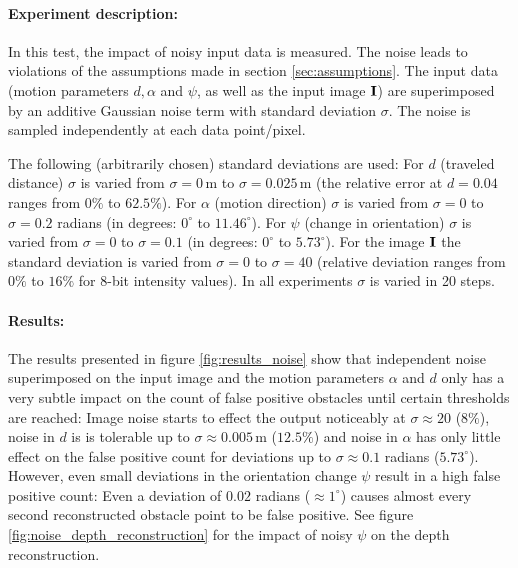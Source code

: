 \paragraph{Experiment description:} In this test, the impact of noisy input data is measured. The noise leads to violations of the assumptions made in section \ref{sec:assumptions}. The input data (motion parameters $d, \alpha$ and $\psi$, as well as the input image $\mathbf{I}$) are superimposed by an additive Gaussian noise term with standard deviation $\sigma$. The noise is sampled independently at each data point/pixel.

The following (arbitrarily chosen) standard deviations are used: For $d$ (traveled distance) $\sigma$ is varied from $\sigma = 0 \, \mathrm{m}$ to $\sigma = 0.025 \, \mathrm{m}$ (the relative error at $d = 0.04$ ranges from $0\%$ to $62.5\%$). For $\alpha$ (motion direction) $\sigma$ is varied from $\sigma = 0 $ to $\sigma = 0.2$ radians (in degrees: $0^\circ$ to $11.46^\circ$). For $\psi$ (change in orientation) $\sigma$ is varied from $\sigma = 0 $ to $\sigma = 0.1$ (in degrees: $0^\circ$ to $5.73^\circ$). For the image $\mathbf{I}$ the standard deviation is varied from $\sigma = 0$ to $\sigma = 40$ (relative deviation ranges from $0\%$ to $16\%$ for 8-bit intensity values). In all experiments $\sigma$ is varied in 20 steps.

\paragraph{Results:} The results presented in figure \ref{fig:results_noise} show that independent noise superimposed on the input image and the motion parameters $\alpha$ and $d$ only has a very subtle impact on the count of false positive obstacles until certain thresholds are reached: Image noise starts to effect the output noticeably at $\sigma \approx 20$ ($8\%$), noise in $d$ is is tolerable up to $\sigma \approx 0.005 \, \mathrm{m}$ ($12.5\%$) and noise in $\alpha$ has only little effect on the false positive count for deviations up to $\sigma \approx 0.1$ radians ($5.73^\circ$). However, even small deviations in the orientation change $\psi$ result in a high false positive count: Even a deviation of $0.02$ radians ($\approx 1^\circ$) causes almost every second reconstructed obstacle point to be false positive. See figure \ref{fig:noise_depth_reconstruction} for the impact of noisy $\psi$ on the depth reconstruction.
